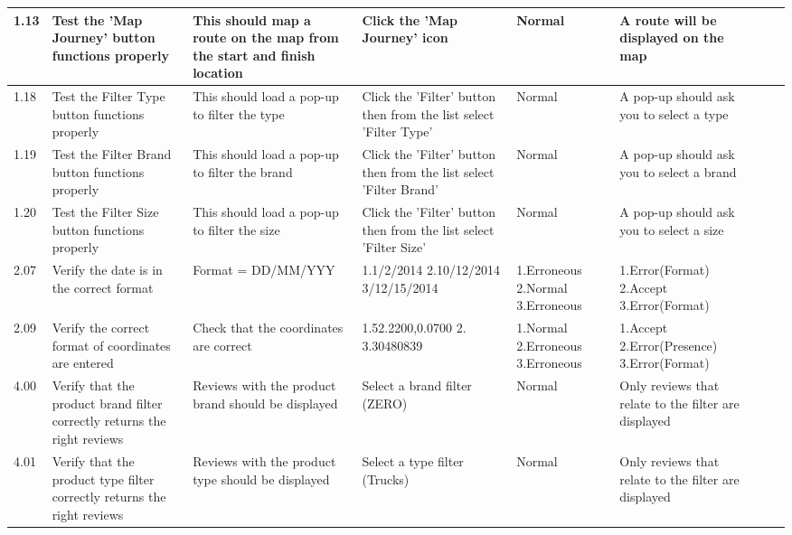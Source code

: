 \begin{landscape}
\begin{center}
\begin{longtable}{|p{1.5cm}|p{2.5cm}|p{2.5cm}|p{2cm}|p{2cm}|p{2cm}|p{2cm}|p{2cm}|}
1.13 & Test the 'Map Journey' button functions properly & This should map a route on the map from the start and finish location &  Click the 'Map Journey' icon & Normal & A route will be displayed on the map &  \\ \hline






1.18 & Test the Filter Type button functions properly & This should load a pop-up to filter the type & Click the 'Filter' button then from the list select 'Filter Type' & Normal &  A pop-up should ask you to select a type &  &\\ \hline

1.19 & Test the Filter Brand button functions properly & This should load a pop-up to filter the brand & Click the 'Filter' button then from the list select 'Filter Brand' & Normal &  A pop-up should ask you to select a brand & & \\ \hline

1.20 & Test the Filter Size button functions properly & This should load a pop-up to filter the size &  Click the 'Filter' button then from the list select 'Filter Size' & Normal &  A pop-up should ask you to select a size & & \\ \hline



2.07 & Verify the date is in the correct format & Format = DD/MM/YYY & 1.1/2/2014 2.10/12/2014 3/12/15/2014 & 1.Erroneous 2.Normal 3.Erroneous & 1.Error(Format) 2.Accept 3.Error(Format) & & \\ \hline 


2.09 & Verify the correct format of coordinates are entered & Check that the coordinates are correct & 1.52.2200,0.0700 2.  3.30480839 & 1.Normal 2.Erroneous 3.Erroneous & 1.Accept 2.Error(Presence) 3.Error(Format) & & \\ \hline






4.00 & Verify that the product brand filter correctly returns the right reviews & Reviews with the product brand should be displayed & Select a brand filter (ZERO) & Normal & Only reviews that relate to the filter are displayed & & \\ \hline

4.01 & Verify that the product type filter correctly returns the right reviews & Reviews with the product type should be displayed & Select a type filter (Trucks) & Normal & Only reviews that relate to the filter are displayed & & \\ \hline


\end{longtable}
\end{center}
\end{landscape}
